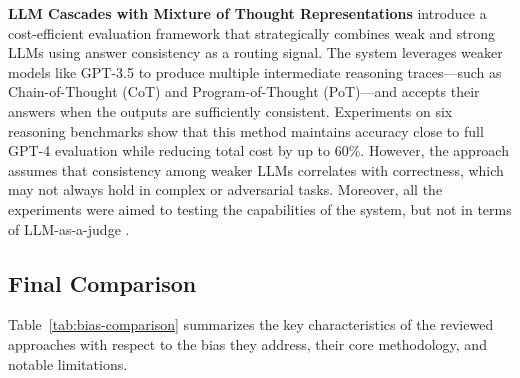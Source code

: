 \documentclass[sigconf, authoryear]{acmart}
\begin{document}
\textbf{LLM Cascades with Mixture of Thought Representations} introduce a cost-efficient evaluation framework that strategically combines weak and strong LLMs using answer consistency as a routing signal.
The system leverages weaker models like GPT-3.5 to produce multiple intermediate reasoning traces—such as Chain-of-Thought (CoT) and Program-of-Thought (PoT)—and accepts their answers when the outputs are sufficiently consistent.
Experiments on six reasoning benchmarks show that this method maintains accuracy close to full GPT-4 evaluation while reducing total cost by up to 60\%.
However, the approach assumes that consistency among weaker LLMs correlates with correctness, which may not always hold in complex or adversarial tasks.
Moreover, all the experiments were aimed to testing the capabilities of the system, but not in terms of LLM-as-a-judge \cite{yue2024largelanguagemodelcascades}.

\subsection{Final Comparison}\label{subsec:final-comparison}

Table~\ref{tab:bias-comparison} summarizes the key characteristics of the reviewed approaches with respect to the bias they address, their core methodology, and notable limitations.
\end{document}

